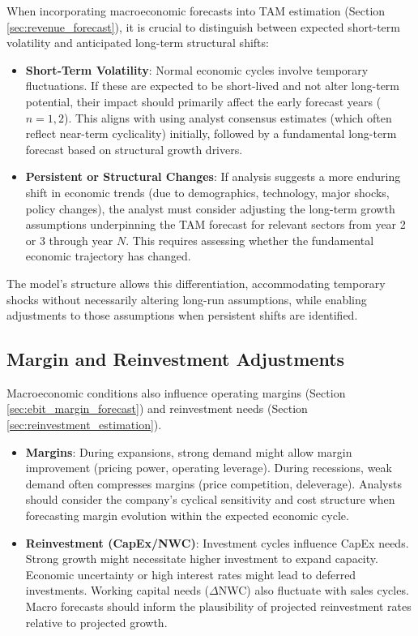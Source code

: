 When incorporating macroeconomic forecasts into TAM estimation (Section \ref{sec:revenue_forecast}), it is crucial to distinguish between expected short-term volatility and anticipated long-term structural shifts:
\begin{itemize}
    \item \textbf{Short-Term Volatility}: Normal economic cycles involve temporary fluctuations. If these are expected to be short-lived and not alter long-term potential, their impact should primarily affect the early forecast years (\(n=1, 2\)). This aligns with using analyst consensus estimates (which often reflect near-term cyclicality) initially, followed by a fundamental long-term forecast based on structural growth drivers.
    \item \textbf{Persistent or Structural Changes}: If analysis suggests a more enduring shift in economic trends (due to demographics, technology, major shocks, policy changes), the analyst must consider adjusting the long-term growth assumptions underpinning the TAM forecast for relevant sectors from year 2 or 3 through year \(N\). This requires assessing whether the fundamental economic trajectory has changed.
\end{itemize}
The model's structure allows this differentiation, accommodating temporary shocks without necessarily altering long-run assumptions, while enabling adjustments to those assumptions when persistent shifts are identified.

\subsection{Margin and Reinvestment Adjustments} \label{subsec:macro_margins_reinvestment}
Macroeconomic conditions also influence operating margins (Section \ref{sec:ebit_margin_forecast}) and reinvestment needs (Section \ref{sec:reinvestment_estimation}).
\begin{itemize}
    \item \textbf{Margins}: During expansions, strong demand might allow margin improvement (pricing power, operating leverage). During recessions, weak demand often compresses margins (price competition, deleverage). Analysts should consider the company's cyclical sensitivity and cost structure when forecasting margin evolution within the expected economic cycle.
    \item \textbf{Reinvestment (CapEx/NWC)}: Investment cycles influence CapEx needs. Strong growth might necessitate higher investment to expand capacity. Economic uncertainty or high interest rates might lead to deferred investments. Working capital needs (\(\Delta\)NWC) also fluctuate with sales cycles. Macro forecasts should inform the plausibility of projected reinvestment rates relative to projected growth.
\end{itemize}


